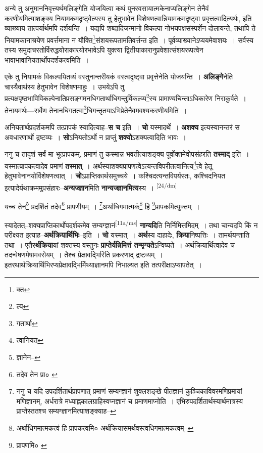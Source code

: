 \documentclass[article,12pt,a4paper]{memoir}
\begin{document}
	  \pstart अन्ये तु अनुमाननिवृत्त्यर्थमलिङ्गेति योजयित्वा कथं पुनरवसायात्मकेनाप्यलिङ्गेन तेनैवं करणीयमित्याशङ्क्य नियामकमदृष्ट्वेत्यस्य तु हेतुभावेन विशेषणत्वान्नियामकमदृष्ट्वा प्रवृत्तत्वादित्यर्थः, इति व्याख्याय तात्पर्यार्थमपि दर्शयन्ति । यद्यपि शब्दादिजन्मानो विकल्पा नोभयपक्षसंस्पर्शेन दोलायन्ते, तथापि ते नियामकानाश्रयेण प्रवर्त्तमाना न यौक्ति\footnote{क्त}संशयरूपतामतिवर्त्तन्त इति । पूर्वव्याख्यानेऽप्ययमेवाशयः । सर्वस्य तस्य समुदाचरतोर्विरुद्धयोराकारयोरभावेऽपि युक्त्या द्वितीयाकारानुप्रवेशात्संशयरूपत्वेन भावाभावानियतार्थोपदर्शकत्वमिति ।
	\pend
      

	  \pstart एके तु नियामकं विकल्पयितव्यं वस्तुनान्तरीयकं वस्त्वदृष्ट्वा प्रवृत्तेनेति योजयन्ति । \textbf{अलिङ्गे}नेति चास्यैवार्थस्य हेतुभावेन विशेषणमाहुः । उभयेऽपि तु प्रत्यक्षपृष्ठभाविविकल्पेनातिप्रसङ्गमनधिगतार्थाधिगन्तुर्विकल्प्य\footnote{ल्प}स्य प्रामाण्यचिन्ताऽधिकारेण निराकुर्वते । तेनायमर्थः—सर्वेण तेनानधिगतत्वा\footnote{गतार्था}धिगन्तृतयाऽभिप्रेतेनैवमवश्यकरणीयमिति ।
	\pend
      

	  \pstart अनियतार्थप्रदर्शकमपि तत्प्रापकं स्यादित्याह--\textbf{स च} इति । \textbf{चो} यस्मादर्थे । \textbf{अशक्य} इत्यस्यानन्तरं स अवधारणार्थो द्रष्टव्यः । \textbf{सो}ऽनियतोऽर्थो न प्राप्तुं \textbf{शक्यो}ऽशक्यत्वादिति भावः ।
	\pend
      

	  \pstart ननु च तादृशं सर्वं मा भूत्प्रापकम्, प्रमाणं तु कस्मान्न भवतीत्याशङ्क्य पूर्वोक्तमेवोपसंहरति \textbf{तस्माद्} इति । यस्मात्प्रापकत्वादेव प्रमाणं \textbf{तस्मात्} । अर्थस्याशक्यप्रापणत्वेऽत्यन्तविपरीतत्वानित्य\footnote{त्वानियत}त्वे हेतू हेतुभावेनानयोर्विशेषणत्वात् । \textbf{चो}ऽप्राप्तिकार्थसमुच्चये । कश्चिदत्यन्तविपर्यस्तः, कश्चिदनियत इत्यादेर्यथाक्रममुपसंहारः--\textbf{अन्यज्ज्ञान}मिति \textbf{नान्यज्ज्ञानमित्य}स्य ।
	\pend
      \leavevmode\textsuperscript{\rmlatinfont\tiny [24/dm]}

	  \pstart यच्च तेन\footnote{ज्ञानेन--\cite{dp-msD-n}} प्रदर्शितं तदेव\footnote{तदेव तेन प्रा० \cite{dp-msC} \cite{dp-msD}} प्रापणीयम् । \footnote{ननु च यदि उपदर्शितार्थप्रापणात् प्रमाणं सम्यग्ज्ञानं शुक्लशङ्खे पीतज्ञानं कुञ्चिकाविवरमणिप्रमायां मणिज्ञानम्, अर्धरात्रे मध्याह्नकालग्राहिस्वप्नज्ञानं च प्रमाणमाप्नोति । एभिरुपदर्शितार्थस्यार्थमात्रस्य प्राप्तेस्ततश्च सम्यग्ज्ञानमित्याशङ्क्याह--\cite{dp-msD-n}}अर्थाधिगमात्मकं\footnote{अर्थाधिगमात्मकत्वं हि प्रापकत्वमि० \cite{dp-msC} \cite{dp-msD} अर्थक्रियासमर्थवस्त्वधिगमात्मकत्वम्--\cite{dp-msB}} हि \footnote{प्रापणमि० \cite{dp-edN}}प्रापकमित्युक्तम् ।
	\pend
      

	  \pstart स्यादेतत्--शक्यप्राप्तिकार्थोपदर्शकमेव सम्यग्ज्ञानं\leavevmode\textsuperscript{\rmlatinfont\tiny [11a/ms]} \textbf{नान्यदि}ति निर्निमित्तमिदम् । तथा चान्यदपि किं न परीक्ष्यत इत्याह--\textbf{अर्थक्रियार्थिभिः}--इति । \textbf{चो} यस्मात् । \textbf{अर्थ}स्य दाहादेः, \textbf{क्रिया}निष्पत्तिः । तामर्थयन्ताति तथा । एतैर\textbf{र्थक्रिया}यां शक्तस्य वस्तुनः \textbf{प्राप्तेर्यन्निमित्तं तन्मृग्यते}ऽन्विष्यते । अर्थक्रियार्थित्वादेव च तदन्वेषणमेषामवसेयम् । तैश्च प्रेक्षावद्भिरिति प्रकरणाद् द्रष्टव्यम् । इतरथार्थक्रियार्थिभिरप्यप्रेक्षावद्भिर्मिथ्याज्ञानमपि निभाल्यत इति तत्परीक्षाऽप्यापतेत् ।
	\pend
      
\end{document}
